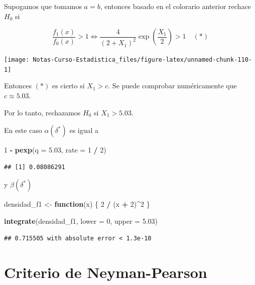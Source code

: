 \documentclass[
  12pt,
]{book}
\newenvironment{Shaded}{\begin{snugshade}}{\end{snugshade}}
\newcommand{\ControlFlowTok}[1]{\textcolor[rgb]{0.13,0.29,0.53}{\textbf{#1}}}
\newcommand{\DataTypeTok}[1]{\textcolor[rgb]{0.13,0.29,0.53}{#1}}
\newcommand{\DecValTok}[1]{\textcolor[rgb]{0.00,0.00,0.81}{#1}}
\newcommand{\FloatTok}[1]{\textcolor[rgb]{0.00,0.00,0.81}{#1}}
\newcommand{\KeywordTok}[1]{\textcolor[rgb]{0.13,0.29,0.53}{\textbf{#1}}}
\newcommand{\NormalTok}[1]{#1}
\newcommand{\OperatorTok}[1]{\textcolor[rgb]{0.81,0.36,0.00}{\textbf{#1}}}
\newcommand{\StringTok}[1]{\textcolor[rgb]{0.31,0.60,0.02}{#1}}
\begin{document}
Supogamos que tomamos \(a=b\), entonces basado en el colorario anterior rechace
\(H_0\) si

\[\dfrac{f_1(x)}{f_0(x)}>1\Leftrightarrow
\dfrac 4{(2+X_1)^2}\exp\left(\dfrac{X_1}2\right)>1\quad(*)\]

\begin{center}\texttt{[image: Notas-Curso-Estadistica\_files/figure-latex/unnamed-chunk-110-1]} \end{center}

Entonces \((*)\) es cierto si \(X_1>c\). Se puede comprobar numéricamente que \(c\approx5.03\).

Por lo tanto, rechazamos \(H_0\) si \(X_1>5.03\).

En este caso \(\alpha(\delta^*)\) es igual a

\begin{Shaded}
\begin{Highlighting}[]
\DecValTok{1} \OperatorTok{{-}}\StringTok{ }\KeywordTok{pexp}\NormalTok{(}\DataTypeTok{q =} \FloatTok{5.03}\NormalTok{, }\DataTypeTok{rate =} \DecValTok{1} \OperatorTok{/}\StringTok{ }\DecValTok{2}\NormalTok{)}
\end{Highlighting}
\end{Shaded}

\begin{verbatim}
## [1] 0.08086291
\end{verbatim}

y \(\beta(\delta^*)\)

\begin{Shaded}
\begin{Highlighting}[]
\NormalTok{densidad\_f1 \textless{}{-}}\StringTok{ }\ControlFlowTok{function}\NormalTok{(x) \{}
  \DecValTok{2} \OperatorTok{/}\StringTok{ }\NormalTok{(x }\OperatorTok{+}\StringTok{ }\DecValTok{2}\NormalTok{)}\OperatorTok{\^{}}\DecValTok{2}
\NormalTok{\}}

\KeywordTok{integrate}\NormalTok{(densidad\_f1, }\DataTypeTok{lower =} \DecValTok{0}\NormalTok{, }\DataTypeTok{upper =} \FloatTok{5.03}\NormalTok{)}
\end{Highlighting}
\end{Shaded}

\begin{verbatim}
## 0.715505 with absolute error < 1.3e-10
\end{verbatim}

\hypertarget{criterio-de-neyman-pearson}{%
\section{Criterio de Neyman-Pearson}\label{criterio-de-neyman-pearson}}
\end{document}
